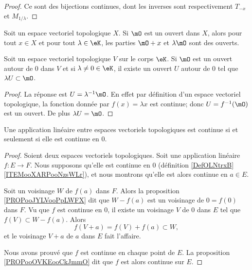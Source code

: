 \begin{proof}
	Ce sont des bijections continues, dont les inverses sont respectivement \( T_{-x} \) et \( M_{1/\lambda} \).
\end{proof}


\begin{proposition}		\label{PROPooJYLVooPpLWFX}
	Soit un espace vectoriel topologique \( X\). Si \( \mO\) est un ouvert dans \( X\), alors pour tout \( x\in X\) et pour tout \( \lambda\in \eK\), les parties \( \mO+x\) et \( \lambda \mO\) sont des ouverts.
\end{proposition}


\begin{lemma}            \label{LEMooEZIYooBBxdJj}
	Soit un espace vectoriel topologique \( V\) sur le corps \( \eK\). Si \( \mO\) est un ouvert autour de \( 0\) dans \( V\) et si \( \lambda\neq 0\in \eK\), il existe un ouvert \( U\) autour de \( 0\) tel que \( \lambda U\subset \mO\).
\end{lemma}

\begin{proof}
	La réponse est \( U=\lambda^{-1}\mO\). En effet par définition d'un espace vectoriel topologique, la fonction donnée par \( f(x)=\lambda x  \) est continue; donc \( U=f^{-1}(\mO)\) est un ouvert. De plus \( \lambda U=\mO\).
\end{proof}

\begin{proposition}	\label{PROPooHKGZooDaNaHU}
	Une application linéaire entre espaces vectoriels topologiques est continue si et seulement si elle est continue en \( 0\).
\end{proposition}

\begin{proof}
	Soient deux espaces vectoriels topologiques. Soit une application linéaire \(f \colon E\to F  \). Nous supposons qu'elle est continue en \( 0\) (définition \ref{DefOLNtrxB}\ref{ITEMooXARPooNzsWLr}), et nous montrons qu'elle est alors continue en \( a\in E\).

	Soit un voisinage \( W\) de \( f(a)\) dans \( F\). Alors la proposition \ref{PROPooJYLVooPpLWFX} dit que \( W-f(a)\) est un voisinage de \( 0=f(0)\) dans \( F\). Vu que \( f\) est continue en \( 0\), il existe un voisinage \( V\) de \( 0\) dans \( E\) tel que \( f(V)\subset W-f(a)\). Alors
	\begin{equation}
		f(V+a)=f(V)+f(a)\subset W,
	\end{equation}
	et le voisinage \( V+a\) de \( a\) dans \( E\) fait l'affaire.

	Nous avons prouvé que \( f\) est continue en chaque point de \( E\). La proposition \ref{PROPooOVKEooCkJmmO} dit que \( f\) est alors continue sur \( E\).
\end{proof}

